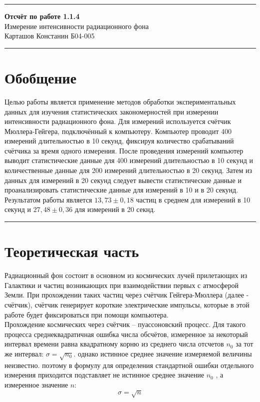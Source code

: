 \documentclass[a4paper,12pt]{article} %
\begin{document}
\hrule 
\medskip
\begin{raggedright}
{\large \textbf{Отсчёт по работе 1.1.4}}
\\
\medskip
{\Large Измерение интенсивности радиационного фона} 
\\
\medskip
{\large Карташов Констанин Б04-005}
\medskip
\hrule
\medskip
\end{raggedright}


\section{Обобщение}

Целью работы является применение методов обработки экспериментальных данных для изучения статистических закономерностей при измерении интенсивности радиационного фона. Для измерений используется счётчик Мюллера-Гейгера, подключённый к компьютеру. Компьютер проводит 400 измерений длительностью в 10 секунд, фиксируя количество срабатываний счётчика за время одного измерения. После проведения измерений компьютер выводит статистические данные для 400 измерений длительностью в 10 секунд и количественные данные для 200 измерений длительностью в 20 секунд. Затем из данных для измерений в 20 секунд следует вывести статистические данные и проанализировать статистические данные для измерений в 10 и в 20 секунд. Результатом работы является $13,73\pm0,18$ частиц в среднем для измерений в 10 секунд и $27,48\pm0,36$ для измерений в 20 секнд.
\medskip\hrule\medskip

\section{Теоретическая часть}

Радиационный фон состоит в основном из космических лучей прилетающих из Галактики и частиц возникающих при взаимодействии первых с атмосферой Земли. При прохождении таких частиц через счётчик Гейгера-Мюллера (далее - счётчик), счётчик генерирует короткие электрические импульсы, которые в этой работе будет фиксироваться при помощи компьютера.\\

Прохождение космических через счётчик – пуассоновский процесс. Для такого процесса среднеквадратичная ошибка числа обсчётов, измеренное за некоторый интервал времени равна квадратному корню из среднего числа отсчетов $ n_0 $ за тот же интервал: $ \sigma= \sqrt{n_0} $. однако истинное среднее значение измеряемой величины неизвестно. поэтому в формулу для определения стандартной ошибки отдельного измерения приходится подставляет не истинное среднее значение $ n_0 $ , а  измеренное значение $ n $:
\begin{equation}
\sigma = \sqrt{n}
\end{equation}
\end{document}
